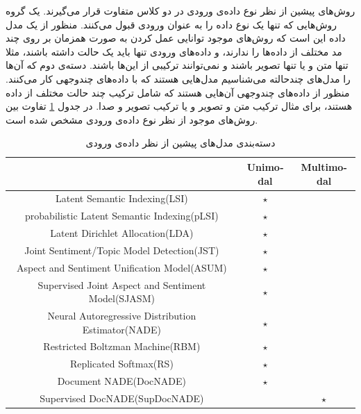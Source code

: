 روش‌های پیشین از نظر نوع داده‌ی ورودی در دو کلاس متفاوت قرار می‌‌گیرند. یک گروه روش‌هایی که تنها یک نوع داده را به عنوان ورودی قبول می‌‌کنند. منظور از یک مدل داده این است که روش‌های موجود توانایی عمل کردن به صورت همزمان بر روی چند مد مختلف از داده‌ها را ندارند، و داده‌های ورودی تنها باید یک حالت داشته باشند، مثلا تنها متن و یا تنها تصویر باشند و نمی‌‌توانند ترکیبی‌ از این‌ها باشند. دسته‌ی دوم که آن‌ها را مدل‌های چندحالته می‌‌شناسیم مدل‌هایی هستند که با داده‌های چندوجهی کار می‌‌کنند. منظور از داده‌های چندوجهی آن‌هایی هستند که شامل ترکیب چند حالت مختلف از داده هستند، برای مثال ترکیب متن و تصویر و یا ترکیب تصویر و صدا. در جدول
\ref{tabel3-3}
تفاوت بین روش‌های موجود از نظر نوع داد‌ه‌ی ورودی مشخص شده است.
\begin{table}[!b]
	\centering
	\begin{latin}
		\begin{tabular}{|c|c|c|}
			\hline
			                            & Unimodal & Multimodal \\ \hline
			          Latent Semantic Indexing(LSI)            & $\star$  &  \\ \hline
			   probabilistic Latent Semantic Indexing(pLSI)    & $\star$  &  \\ \hline
			         Latent Dirichlet Allocation(LDA)          & $\star$  &  \\ \hline
			    Joint Sentiment/Topic Model Detection(JST)     & $\star$  &  \\ \hline
			   Aspect and Sentiment Unification Model(ASUM)    & $\star$  &  \\ \hline
            Supervised Joint Aspect and Sentiment Model(SJASM) & $\star$  &  \\ \hline
			Neural Autoregressive Distribution Estimator(NADE) & $\star$  &  \\ \hline
			         Restricted Boltzman Machine(RBM)          & $\star$  &  \\ \hline
			              Replicated Softmax(RS)               & $\star$  &  \\ \hline
			              Document NADE(DocNADE)               & $\star$  &  \\ \hline
			          Supervised DocNADE(SupDocNADE)           &          &  $\star$   \\ \hline
		\end{tabular}
	\end{latin}
	\caption{دسته‌بندی مدل‌های پیشین از نظر داده‌ی ورودی}
	\label{tabel3-3}
\end{table}


